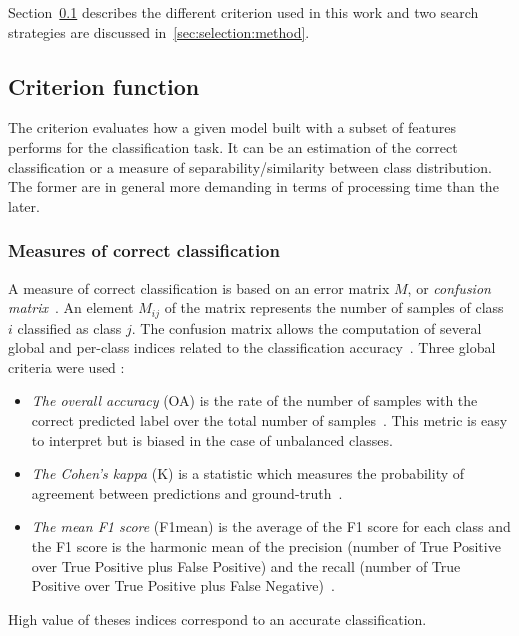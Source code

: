 \documentclass[journal,peerreview,onecolumn]{IEEEtran}
\begin{document}
Section~\ref{sec:criterion} describes the different criterion used in this work and two search strategies are discussed in~\ref{sec:selection:method}.


    \subsection{Criterion function}
    \label{sec:criterion}
    The criterion evaluates how a given model built with a subset of features performs for the classification task. It can be an estimation of the correct classification or a measure of separability/similarity between class distribution. The former are in general more demanding in terms of processing time than the later.


        \subsubsection{Measures of correct classification}
        \label{sec:criterion-rate}

        A measure of correct classification is based on an error matrix $M$, or \emph{confusion matrix}~\cite[Chapter 4]{congalton2008assessing}. An element $M_{ij}$ of the matrix represents the number of samples of class $i$ classified as class $j$. The confusion matrix allows the computation of several global and per-class indices related to the classification accuracy~\cite{congalton2008assessing}. Three global criteria were used :

        \begin{itemize}
        \item  \emph{The overall  accuracy} (OA)  is the  rate of  the
          number of samples with the  correct predicted label over the
          total  number of  samples~\cite{congalton2008assessing}. This
          metric is  easy to interpret  but is  biased in the  case of
          unbalanced classes.

        \item \emph{The Cohen's kappa} (K) is a statistic which measures the probability of agreement between predictions and ground-truth~\cite{congalton2008assessing}.

        \item \emph{The mean F1 score}  (F1mean) is the average of the
          F1 score  for each class  and the  F1 score is  the harmonic
          mean of  the precision  (number of  True Positive  over True
          Positive plus False Positive) and the recall (number of True
          Positive over True Positive plus False Negative)~\cite{powers2011evaluation}.
        \end{itemize}
        High  value  of  theses  indices  correspond  to  an  accurate
        classification.
\end{document}
